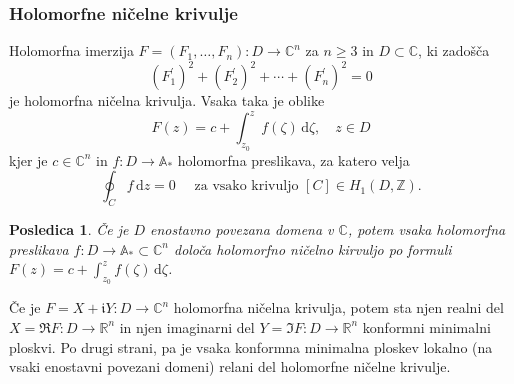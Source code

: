 \documentclass[8pt]{beamer}
\theoremstyle{definition}
\theoremstyle{remark}
\theoremstyle{plain}
\newtheorem{posledica}[definicija]{Posledica}
\numberwithin{equation}{section}  %
\begin{document}
\begin{frame}
    \frametitle{Holomorfne ničelne krivulje}

    Holomorfna imerzija $F=\left(F_1, \ldots, F_n\right): D \rightarrow \mathbb{C}^n$ za $n\geq 3$ in $D\subset \mathbb{C}$, ki zadošča  
    \begin{equation*}
        \left(F_1^{\prime}\right)^2+\left(F_2^{\prime}\right)^2+\cdots+\left(F_n^{\prime}\right)^2=0      
    \end{equation*}
    je \textcolor{red1}{holomorfna ničelna krivulja}. Vsaka taka je oblike 
    \begin{equation*}
        F(z)=c+\int_{z_0}^z f(\zeta) \, \mathrm{d} \zeta, \quad z \in D
    \end{equation*}
    kjer je $c \in \mathbb{C}^n$ in $f:D \rightarrow \mathbb{A}_*$ holomorfna preslikava, za katero velja
    \begin{equation*}
        \oint_C f \, \mathrm{d} z=0 \quad \text { za vsako krivuljo } [C] \in H_1(D, \mathbb{Z}). 
    \end{equation*}
    \begin{posledica}
        Če je $D$ enostavno povezana domena v $\mathbb{C}$, potem vsaka holomorfna preslikava $f: D \rightarrow \mathbb{A}_* \subset \mathbb{C}^n$ določa holomorfno ničelno kirvuljo po formuli $F(z)=c+\int_{z_0}^z f(\zeta) \, \mathrm{d} \zeta$.  
    \end{posledica}
    Če je $F=X+\mathfrak{i} Y: D \rightarrow \mathbb{C}^n$ holomorfna ničelna krivulja, potem sta njen realni del $X=\Re F: D \rightarrow \mathbb{R}^n$ in njen imaginarni del $Y=\Im F: D \rightarrow \mathbb{R}^n$ konformni minimalni ploskvi. Po drugi strani, pa je vsaka konformna minimalna ploskev lokalno (na vsaki enostavni povezani domeni) relani del holomorfne ničelne krivulje. 
    
\end{frame}
\end{document}
